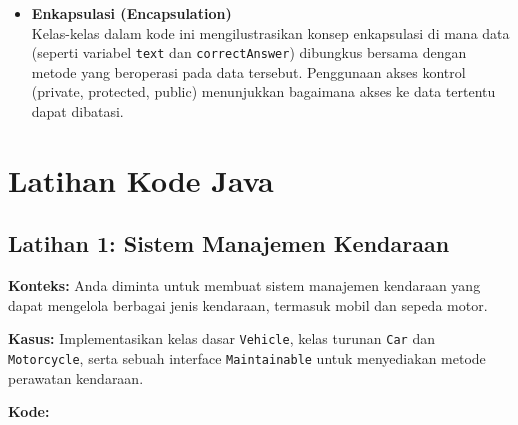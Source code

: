 \begin{itemize}
	\item \textbf{Enkapsulasi (Encapsulation)} \\
	Kelas-kelas dalam kode ini mengilustrasikan konsep enkapsulasi di mana data (seperti variabel \texttt{text} dan \texttt{correctAnswer}) dibungkus bersama dengan metode yang beroperasi pada data tersebut. Penggunaan akses kontrol (private, protected, public) menunjukkan bagaimana akses ke data tertentu dapat dibatasi.
\end{itemize}


\section{Latihan Kode Java}

\subsection{Latihan 1: Sistem Manajemen Kendaraan}

\textbf{Konteks:} Anda diminta untuk membuat sistem manajemen kendaraan yang dapat mengelola berbagai jenis kendaraan, termasuk mobil dan sepeda motor.

\textbf{Kasus:} Implementasikan kelas dasar \texttt{Vehicle}, kelas turunan \texttt{Car} dan \texttt{Motorcycle}, serta sebuah interface \texttt{Maintainable} untuk menyediakan metode perawatan kendaraan.

\textbf{Kode:}

